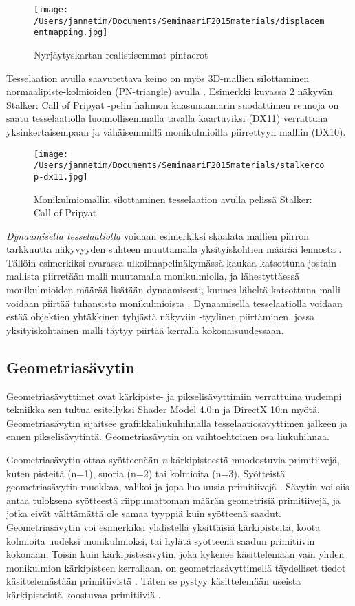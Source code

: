 \documentclass[finnish]{tktltiki2}
\theoremstyle{definition}
\theoremstyle{remark}
\begin{document}
\begin{figure}[t]
\texttt{[image: /Users/jannetim/Documents/SeminaariF2015materials/displacementmapping.jpg]}
\caption{Nyrjäytyskartan realistisemmat pintaerot}
\label{displacement}
\end{figure}

Tesselaation avulla saavutettava keino on myös 3D-mallien silottaminen normaalipiste-kolmioiden (PN-triangle) avulla \cite{Vla01}. Esimerkki kuvassa \ref{SCoP} näkyvän Stalker: Call of Pripyat -pelin hahmon kaasunaamarin suodattimen reunoja on saatu tesselaatiolla luonnollisemmalla tavalla kaartuviksi (DX11) verrattuna yksinkertaisempaan ja vähäisemmillä monikulmioilla piirrettyyn malliin (DX10). 

\begin{figure}[!hbpt]
\texttt{[image: /Users/jannetim/Documents/SeminaariF2015materials/stalkercop-dx11.jpg]}
\caption{Monikulmiomallin silottaminen tesselaation avulla pelissä Stalker: Call of Pripyat}
\label{SCoP}
\end{figure}

\emph{Dynaamisella tesselaatiolla} voidaan esimerkiksi skaalata mallien piirron tarkkuutta näkyvyyden suhteen muuttamalla yksityiskohtien määrää lennosta \cite{Nvi10}. Tällöin esimerkiksi avarassa ulkoilmapelinäkymässä kaukaa katsottuna jostain mallista piirretään malli muutamalla monikulmiolla, ja lähestyttäessä monikulmioiden määrää lisätään dynaamisesti, kunnes läheltä katsottuna malli voidaan piirtää tuhansista monikulmioista \cite{Gre14}. Dynaamisella tesselaatiolla voidaan estää objektien yhtäkkinen tyhjästä näkyviin -tyylinen piirtäminen, jossa yksityiskohtainen malli täytyy piirtää kerralla kokonaisuudessaan.

\subsection{Geometriasävytin}

Geometriasävyttimet ovat kärkipiste- ja pikselisävyttimiin verrattuina uudempi tekniikka sen tultua esitellyksi Shader Model 4.0:n ja DirectX 10:n myötä. Geometriasävytin sijaitsee grafiikkaliukuhihnalla tesselaatiosävyttimen jälkeen ja ennen pikselisävytintä. Geometriasävytin on vaihtoehtoinen osa liukuhihnaa.

Geometriasävytin ottaa syötteenään \emph{n}-kärkipisteestä muodostuvia primitiivejä, kuten pisteitä (n=1), suoria (n=2) tai kolmioita (n=3).  Syötteistä geometriasävytin muokkaa, valikoi ja jopa luo uusia primitiivejä \cite{Gre14}. Sävytin voi siis antaa tuloksena syötteestä riippumattoman määrän geometrisiä primitiivejä, ja jotka eivät välttämättä ole samaa tyyppiä kuin syötteenä saadut. Geometriasävytin voi esimerkiksi yhdistellä yksittäisiä kärkipisteitä, koota kolmioita uudeksi monikulmioksi, tai hylätä syötteenä saadun primitiivin kokonaan. Toisin kuin kärkipistesävytin, joka kykenee käsittelemään vain yhden monikulmion kärkipisteen kerrallaan, on geometriasävyttimellä täydelliset tiedot käsittelemästään primitiivistä \cite{Khr15}. Täten se pystyy käsittelemään useista kärkipisteistä koostuvaa primitiiviä \cite{Mic11}.
\end{document}
